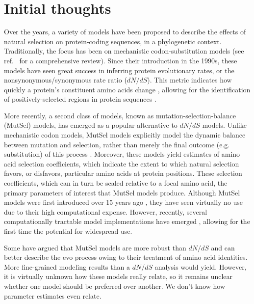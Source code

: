 \documentclass[11pt]{article}
\begin{document}
\section*{Initial thoughts}

Over the years, a variety of models have been proposed to describe the effects of natural selection on protein-coding sequences, in a phylogenetic context. Traditionally, the focus has been on mechanistic codon-substitution models (see ref.~\cite{Anisimova2009} for a comprehensive review). Since their introduction in the 1990s, these models have seen great success in inferring protein evolutionary rates, or the nonsynonymous/synonymous rate ratio ($dN/dS$). This metric indicates how quickly a protein's constituent amino acids change \cite{GoldmanYang1994, MuseGaut1994, NielsenYang1998}, allowing for the identification of positively-selected regions in protein sequences \cite{ NielsenYang1998,Yangetal2000}. 

More recently, a second class of models, known as mutation-selection-balance (MutSel) models, has emerged as a popular alternative to $dN/dS$ models. Unlike mechanistic codon models, MutSel models explicitly model the dynamic balance between mutation and selection, rather than merely the final outcome (e.g. substitution) of this process \cite{HalpernBruno1998, YangNielsen2008, Rodrigueetal2010, Tamurietal2012}. Moreover, these models yield estimates of amino acid selection coefficients, which indicate the extent to which natural selection favors, or disfavors, particular amino acids at protein positions. These selection coefficients, which can in turn be scaled relative to a focal amino acid, the primary parameters of interest that MutSel models produce. Although MutSel models were first introduced over 15 years ago \cite{HalpernBruno1998}, they have seen virtually no use due to their high computational expense. However, recently, several computationally tractable model implementations have emerged \cite{RodrigueLartillot2014,Tamurietal2014}, allowing for the first time the potential for widespread use. 

Some have argued that MutSel models are more robust than $dN/dS$ and can better describe the evo process owing to their treatment of amino acid identities. More fine-grained modeling results than a $dN/dS$ analysis would yield. However, it is virtually unknown how these models really relate, so it remains unclear whether one model should be preferred over another. We don't know how parameter estimates even relate.
\end{document}
